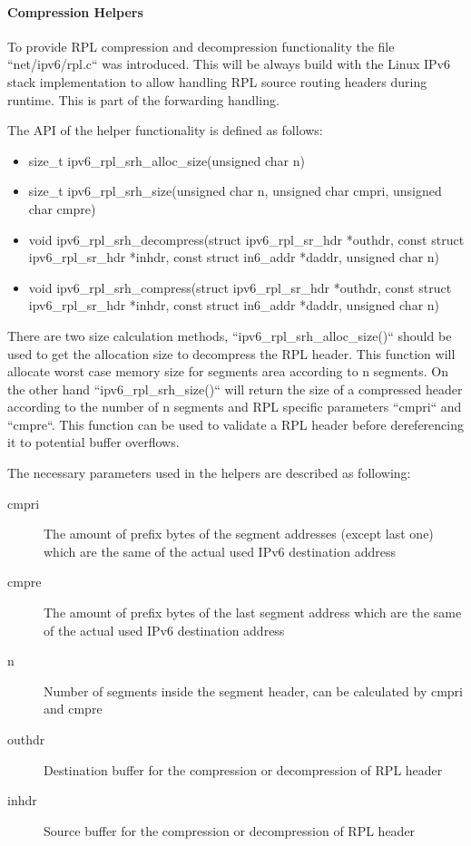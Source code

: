 \documentclass[letterpaper]{article}
\begin{document}
\paragraph{Compression Helpers}

To provide RPL compression and decompression functionality the file ``net/ipv6/rpl.c`` was introduced.
This will be always build with the Linux IPv6 stack implementation to allow
handling RPL source routing headers during runtime.
This is part of the forwarding handling.

The API of the helper functionality is defined as follows:

\begin{itemize}
	\item{size\_t ipv6\_rpl\_srh\_alloc\_size(unsigned char n)}
	\item{size\_t ipv6\_rpl\_srh\_size(unsigned char n, unsigned char cmpri, unsigned char cmpre)}
	\item{void ipv6\_rpl\_srh\_decompress(struct ipv6\_rpl\_sr\_hdr *outhdr, const struct ipv6\_rpl\_sr\_hdr *inhdr, const struct in6\_addr *daddr, unsigned char n)}
	\item{void ipv6\_rpl\_srh\_compress(struct ipv6\_rpl\_sr\_hdr *outhdr, const struct ipv6\_rpl\_sr\_hdr *inhdr, const struct in6\_addr *daddr, unsigned char n)}
\end{itemize}

There are two size calculation methods, ``ipv6\_rpl\_srh\_alloc\_size()`` should
be used to get the allocation size to decompress the RPL header.
This function will allocate worst case memory size for segments area according to n segments.
On the other hand ``ipv6\_rpl\_srh\_size()`` will return the size of a compressed header according to the number of n segments and RPL specific parameters ``cmpri`` and ``cmpre``.
This function can be used to validate a RPL header before dereferencing it to
potential buffer overflows.

The necessary parameters used in the helpers are described as following:

\begin{description}
	\item[cmpri]{The amount of prefix bytes of the segment addresses (except last one) which are the same of the actual used IPv6 destination address}
	\item[cmpre]{The amount of prefix bytes of the last segment address which are the same of the actual used IPv6 destination address}
	\item[n]{Number of segments inside the segment header, can be calculated by cmpri and cmpre}
	\item[outhdr]{Destination buffer for the compression or decompression of RPL header}
	\item[inhdr]{Source buffer for the compression or decompression of RPL header}
\end{description}
\end{document}
